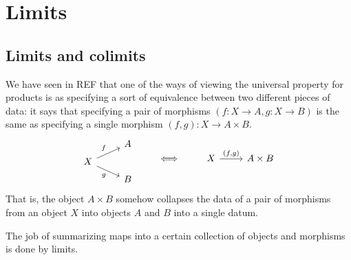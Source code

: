 \documentclass[notes.tex]{subfiles}
\begin{document}
\chapter{Limits}\label{sec:limits}

\section{Limits and colimits}

We have seen in REF that one of the ways of viewing the universal property for products is as specifying a sort of equivalence between two different pieces of data: it says that specifying a pair of morphisms $(f\colon X \to A, g\colon X \to B)$ is the same as specifying a single morphism $(f, g)\colon X \to A \times B$.
\begin{equation*}
  \begin{tikzcd}[row sep=tiny]
    & A
    \\
    X
    \arrow[ur, "f"]
    \arrow[dr, swap, "g"]
    \\
    & B
  \end{tikzcd}
  \qquad \iff \qquad
  \begin{tikzcd}
    X
    \arrow[r, "{(f, g)}"]
    & A \times B
  \end{tikzcd}
\end{equation*}
That is, the object $A \times B$ somehow collapses the data of a pair of morphisms from an object $X$ into objects $A$ and $B$ into a single datum.


The job of summarizing maps into a certain collection of objects and morphisms is done by limits.
\end{document}
